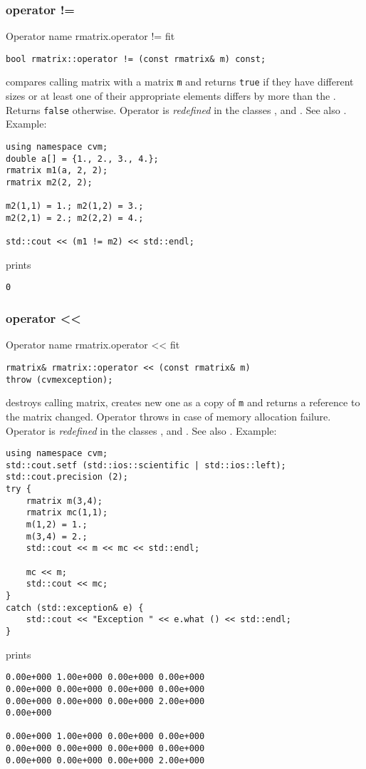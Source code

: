 \subsubsection{operator !=}
Operator%
\pdfdest name {rmatrix.operator !=} fit
\begin{verbatim}
bool rmatrix::operator != (const rmatrix& m) const;
\end{verbatim}
compares  calling matrix with a matrix \verb"m"
and returns \verb"true" if they have different sizes
or at least one of their appropriate elements
differs by more than the
.
Returns \verb"false" otherwise.
Operator is \emph{redefined} in the classes
, 
and .
See also .
Example:
\begin{Verbatim}
using namespace cvm;
double a[] = {1., 2., 3., 4.};
rmatrix m1(a, 2, 2);
rmatrix m2(2, 2);

m2(1,1) = 1.; m2(1,2) = 3.;
m2(2,1) = 2.; m2(2,2) = 4.;

std::cout << (m1 != m2) << std::endl;
\end{Verbatim}
prints
\begin{Verbatim}
0
\end{Verbatim}
\newpage




\subsubsection{operator <{}<}
Operator%
\pdfdest name {rmatrix.operator <<} fit
\begin{verbatim}
rmatrix& rmatrix::operator << (const rmatrix& m)
throw (cvmexception);
\end{verbatim}
destroys  calling matrix, creates  new one as a copy of \verb"m"
and returns a reference to
the matrix changed.
Operator throws  
in case of memory allocation failure.
Operator is \emph{redefined} in the classes
, 
and .
See also .
Example:
\begin{Verbatim}
using namespace cvm;
std::cout.setf (std::ios::scientific | std::ios::left);
std::cout.precision (2);
try {
    rmatrix m(3,4);
    rmatrix mc(1,1);
    m(1,2) = 1.;
    m(3,4) = 2.;
    std::cout << m << mc << std::endl;

    mc << m;
    std::cout << mc;
}
catch (std::exception& e) {
    std::cout << "Exception " << e.what () << std::endl;
}
\end{Verbatim}
prints
\begin{Verbatim}
0.00e+000 1.00e+000 0.00e+000 0.00e+000
0.00e+000 0.00e+000 0.00e+000 0.00e+000
0.00e+000 0.00e+000 0.00e+000 2.00e+000
0.00e+000

0.00e+000 1.00e+000 0.00e+000 0.00e+000
0.00e+000 0.00e+000 0.00e+000 0.00e+000
0.00e+000 0.00e+000 0.00e+000 2.00e+000
\end{Verbatim}
\newpage




